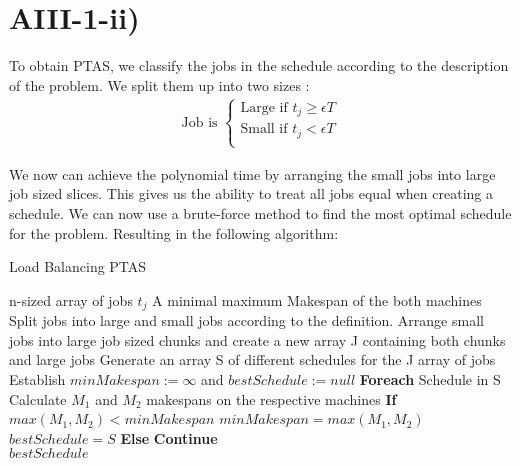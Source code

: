\section*{AIII-1-ii)}
\label{approx-3-1-ii}

To obtain PTAS, we classify the jobs in the schedule according to the description of the problem.
We split them up into two sizes :
\begin{align*}
    \text{Job is } \begin{cases}
        \text{Large} \text{ if } t_j \ge \epsilon T \\
        \text{Small} \text{ if } t_j < \epsilon T \\
    \end{cases}
\end{align*}

We now can achieve the polynomial time by arranging the small jobs into large job sized slices.
This gives us the ability to treat all jobs equal when creating a schedule.
We can now use a brute-force method to find the most optimal schedule for the problem.
Resulting in the following algorithm:
\begin{algorithm}
  \caption{Load Balancing PTAS}
  \label{alg:load_balancing_ptas}
  \begin{algorithmic}
    \renewcommand{\algorithmicrequire}{\textbf{Input:}}
    \renewcommand{\algorithmicensure}{\textbf{Output:}}
    \algnewcommand{}
    \algnewcommand\Operation{\item[\algorithmicoperation]}
    \Require n-sized array of jobs $ t_j $
    \Ensure A minimal maximum Makespan of the both machines
    \Operation
    \State Split jobs into large and small jobs according to the definition. 
    \State Arrange small jobs into large job sized chunks and create a new array J containing both chunks and large jobs
    \State Generate an array S of different schedules for the J array of jobs
    \State Establish $ minMakespan := \infty $ and $ bestSchedule := null $
    \State \textbf{Foreach} Schedule in S
    \State \hspace{\algorithmicindent} Calculate $ M_1 $ and $ M_2 $ makespans on the respective machines
    \State \hspace{\algorithmicindent} \textbf{If} $ max(M_1,M_2) < minMakespan $
    \State \hspace{\algorithmicindent} \hspace{\algorithmicindent} $ minMakespan = max(M_1,M_2) $
    \State \hspace{\algorithmicindent} \hspace{\algorithmicindent} $ bestSchedule = S $ 
    \State \hspace{\algorithmicindent} \textbf{Else}
    \State \hspace{\algorithmicindent} \hspace{\algorithmicindent} \textbf{Continue} \\
    \Return $ bestSchedule $
  \end{algorithmic}
\end{algorithm}

